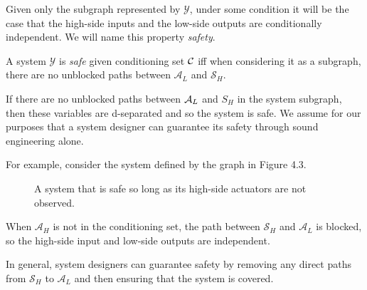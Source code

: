 \documentclass[../thesis.tex]{subfiles}
\begin{document}
Given only the subgraph represented by $\mathcal{Y}$,
under some condition it will be the case that the
high-side inputs and the low-side outputs are conditionally
independent.
We will name this property \emph{safety}.

\begin{dfn}[Safe]
  A system $\mathcal{Y}$ is \emph{safe} given
  conditioning set $\mathcal{C}$ iff
  when considering it as a subgraph,
  there are no unblocked paths between 
  $\mathcal{A}_L$ and $\mathcal{S}_H$.
\end{dfn}

If there are no unblocked paths between $\mathcal{A}_L$ and ${S}_H$
in the system subgraph, then these variables are d-separated
and so the system is safe.
We assume for our purposes that a system designer can
guarantee its safety through sound engineering alone.

For example, consider the system defined by the graph in
Figure 4.3.

\begin{figure}
  \label{fig:safe-system}
\begin{center}
\end{center}
\caption{A system that is safe so long as its high-side actuators are not observed.}
\end{figure}

When $\mathcal{A}_H$ is not in the conditioning set,
the path between $\mathcal{S}_H$ and $\mathcal{A}_L$
is blocked, so the high-side input and low-side
outputs are independent.

In general, system designers can guarantee safety
by removing any direct paths from $\mathcal{S}_H$ to
$\mathcal{A}_L$ and then ensuring that the system is
covered.
\end{document}
